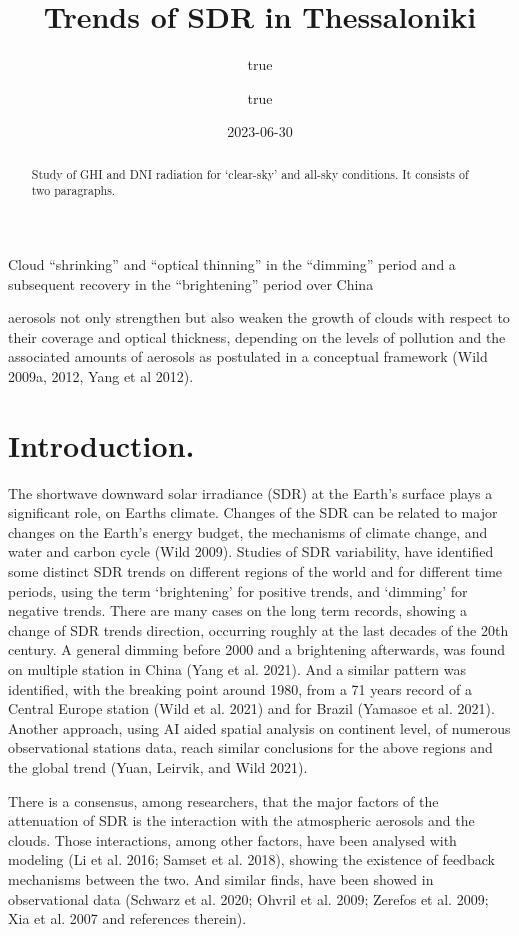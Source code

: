 \documentclass[
  preprint, 3p, authoryear]{article}
\title{Trends of SDR in Thessaloniki}
\author{true \and true}
\date{2023-06-30}
\begin{document}
\maketitle
\begin{abstract}
Study of GHI and DNI radiation for `clear-sky' and all-sky conditions.
It consists of two paragraphs.
\end{abstract}

Cloud ``shrinking'' and ``optical thinning'' in the ``dimming'' period and a subsequent recovery in the ``brightening'' period over China

aerosols not only strengthen but also weaken the
growth of clouds with respect to their coverage and
optical thickness, depending on the levels of pollution
and the associated amounts of aerosols as postulated
in a conceptual framework (Wild 2009a, 2012, Yang
et al 2012).

\hypertarget{introduction.}{%
\section{Introduction.}\label{introduction.}}

The shortwave downward solar irradiance (SDR) at the Earth's surface plays a significant role, on Earths climate.
Changes of the SDR can be related to major changes on the Earth's energy budget, the mechanisms of climate change, and water and carbon cycle (Wild 2009).
Studies of SDR variability, have identified some distinct SDR trends on different regions of the world and for different time periods, using the term `brightening' for positive trends, and `dimming' for negative trends.
There are many cases on the long term records, showing a change of SDR trends direction, occurring roughly at the last decades of the 20th century.
A general dimming before 2000 and a brightening afterwards, was found on multiple station in China (Yang et al. 2021).
And a similar pattern was identified, with the breaking point around 1980, from a 71 years record of a Central Europe station (Wild et al. 2021) and for Brazil (Yamasoe et al. 2021).
Another approach, using AI aided spatial analysis on continent level, of numerous observational stations data, reach similar conclusions for the above regions and the global trend (Yuan, Leirvik, and Wild 2021).

There is a consensus, among researchers, that the major factors of the attenuation of SDR is the interaction with the atmospheric aerosols and the clouds.
Those interactions, among other factors, have been analysed with modeling (Li et al. 2016; Samset et al. 2018), showing the existence of feedback mechanisms between the two.
And similar finds, have been showed in observational data (Schwarz et al. 2020; Ohvril et al. 2009; Zerefos et al. 2009; Xia et al. 2007 and references therein).
\end{document}
